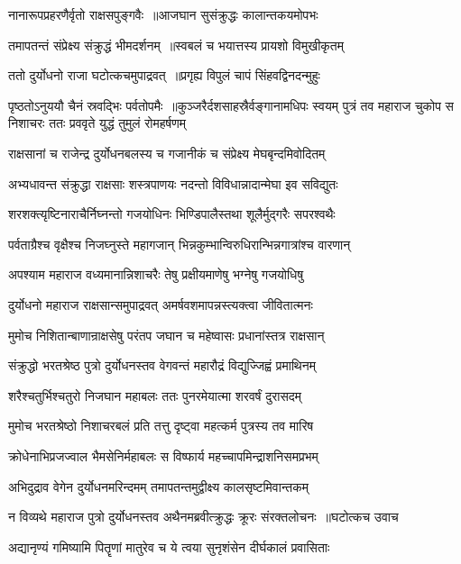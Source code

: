 \twolineshloka
{नानारूपप्रहरणैर्वृतो राक्षसपुङ्गवैः ॥आजघान सुसंक्रुद्धः कालान्तकयमोपभः}
{}


\twolineshloka
{तमापतन्तं संप्रेक्ष्य संक्रुद्धं भीमदर्शनम् ॥स्वबलं च भयात्तस्य प्रायशो विमुखीकृतम्}
{}


\twolineshloka
{ततो दुर्योधनो राजा घटोत्कचमुपाद्रवत् ॥प्रगृह्य विपुलं चापं सिंहवद्विनदन्मुहुः}
{}


पृष्ठतोऽनुययौ चैनं स्रवद्भिः पर्वतोपमैः ॥कुञ्जरैर्दशसाहस्रैर्वङ्गानामधिपः स्वयम्
\twolineshloka
{पुत्रं तव महाराज चुकोप स निशाचरः}
{ततः प्रववृते युद्धं तुमुलं रोमहर्षणम्}


\twolineshloka
{राक्षसानां च राजेन्द्र दुर्योधनबलस्य च}
{गजानीकं च संप्रेक्ष्य मेघबृन्दमिवोदितम्}


\twolineshloka
{अभ्यधावन्त संक्रुद्धा राक्षसाः शस्त्रपाणयः}
{नदन्तो विविधान्नादान्मेघा इव सविद्युतः}


\twolineshloka
{शरशक्त्यृष्टिनाराचैर्निघ्नन्तो गजयोधिनः}
{भिण्डिपालैस्तथा शूलैर्मुद्गरैः सपरश्वथैः}


\twolineshloka
{पर्वताग्रैश्च वृक्षैश्च निजघ्नुस्ते महागजान्}
{भिन्नकुम्भान्विरुधिरान्भिन्नगात्रांश्च वारणान्}


\twolineshloka
{अपश्याम महाराज वध्यमानान्निशाचरैः}
{तेषु प्रक्षीयमाणेषु भग्नेषु गजयोधिषु}


\twolineshloka
{दुर्योधनो महाराज राक्षसान्समुपाद्रवत्}
{अमर्षवशमापन्नस्त्यक्त्वा जीवितात्मनः}


\twolineshloka
{मुमोच निशितान्बाणान्राक्षसेषु परंतप}
{जघान च महेष्वासः प्रधानांस्तत्र राक्षसान्}


\twolineshloka
{संक्रुद्धो भरतश्रेष्ठ पुत्रो दुर्योधनस्तव}
{वेगवन्तं महारौद्रं विद्युज्जिह्वं प्रमाथिनम्}


\twolineshloka
{शरैश्चतुर्भिश्चतुरो निजघान महाबलः}
{ततः पुनरमेयात्मा शरवर्षं दुरासदम्}


\twolineshloka
{मुमोच भरतश्रेष्ठो निशाचरबलं प्रति}
{तत्तु दृष्ट्वा महत्कर्म पुत्रस्य तव मारिष}


\twolineshloka
{क्रोधेनाभिप्रजज्वाल भैमसेनिर्महाबलः}
{स विष्फार्य महच्चापमिन्द्राशनिसमप्रभम्}


\twolineshloka
{अभिदुद्राव वेगेन दुर्योधनमरिन्दमम्}
{तमापतन्तमुद्वीक्ष्य कालसृष्टमिवान्तकम्}


\threelineshloka
{न विव्यथे महाराज पुत्रो दुर्योधनस्तव}
{अथैनमब्रवीत्क्रुद्धः क्रूरः संरक्तलोचनः ॥घटोत्कच उवाच}
{}


\twolineshloka
{अद्यानृण्यं गमिष्यामि पितॄणां मातुरेव च}
{ये त्वया सुनृशंसेन दीर्घकालं प्रवासिताः}


